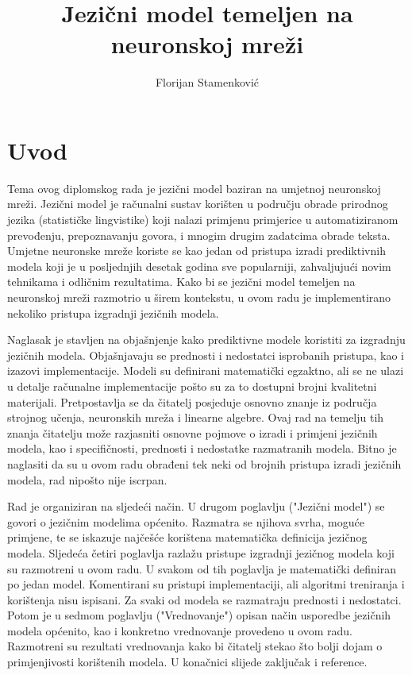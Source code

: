 \documentclass[times, utf8, diplomski, numeric]{fer}
\begin{document}
\title{Jezični model temeljen na neuronskoj mreži}

\author{Florijan Stamenković}

\maketitle

\tableofcontents

\chapter{Uvod}

Tema ovog diplomskog rada je jezični model baziran na umjetnoj neuronskoj mreži. Jezični model je računalni sustav korišten u području obrade prirodnog jezika (statističke lingvistike) koji nalazi primjenu primjerice u automatiziranom prevođenju, prepoznavanju govora, i mnogim drugim zadatcima obrade teksta. Umjetne neuronske mreže koriste se kao jedan od pristupa izradi prediktivnih modela koji je u posljednjih desetak godina sve popularniji, zahvaljujući novim tehnikama i odličnim rezultatima. Kako bi se jezični model temeljen na neuronskoj mreži razmotrio u širem kontekstu, u ovom radu je implementirano nekoliko pristupa izgradnji jezičnih modela.

Naglasak je stavljen na objašnjenje kako prediktivne modele koristiti za izgradnju jezičnih modela. Objašnjavaju se prednosti i nedostatci isprobanih pristupa, kao i izazovi implementacije. Modeli su definirani matematički egzaktno, ali se ne ulazi u detalje računalne implementacije pošto su za to dostupni brojni kvalitetni materijali. Pretpostavlja se da čitatelj posjeduje osnovno znanje iz područja strojnog učenja, neuronskih mreža i linearne algebre. Ovaj rad na temelju tih znanja čitatelju može razjasniti osnovne pojmove o izradi i primjeni jezičnih modela, kao i specifičnosti, prednosti i nedostatke razmatranih modela. Bitno je naglasiti da su u ovom radu obrađeni tek neki od brojnih pristupa izradi jezičnih modela, rad nipošto nije iscrpan.

Rad je organiziran na sljedeći način. U drugom poglavlju ("Jezični model") se govori o jezičnim modelima općenito. Razmatra se njihova svrha, moguće primjene, te se iskazuje najčešće korištena matematička definicija jezičnog modela. Sljedeća četiri poglavlja razlažu pristupe izgradnji jezičnog modela koji su razmotreni u ovom radu. U svakom od tih poglavlja je matematički definiran po jedan model. Komentirani su pristupi implementaciji, ali algoritmi treniranja i korištenja nisu ispisani. Za svaki od modela se razmatraju prednosti i nedostatci. Potom je u sedmom poglavlju ("Vrednovanje") opisan način usporedbe jezičnih modela općenito, kao i konkretno vrednovanje provedeno u ovom radu. Razmotreni su rezultati vrednovanja kako bi čitatelj stekao što bolji dojam o primjenjivosti korištenih modela. U konačnici slijede zaključak i reference.
\end{document}
